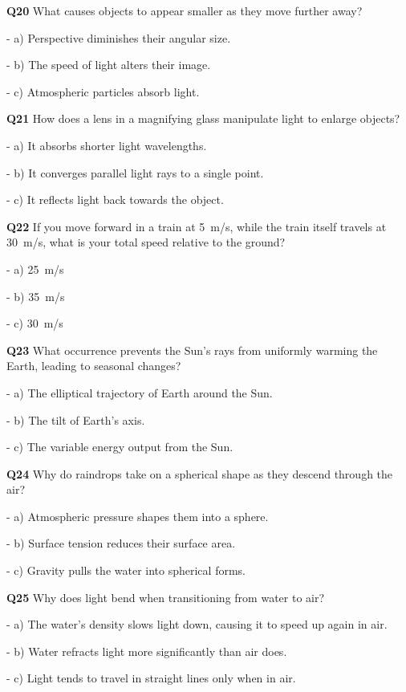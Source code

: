 \textbf{Q20} What causes objects to appear smaller as they move further away?\par
\quad - a) Perspective diminishes their angular size.\par
\quad - b) The speed of light alters their image.\par
\quad - c) Atmospheric particles absorb light.\par

\textbf{Q21} How does a lens in a magnifying glass manipulate light to enlarge objects?\par
\quad - a) It absorbs shorter light wavelengths.\par
\quad - b) It converges parallel light rays to a single point.\par
\quad - c) It reflects light back towards the object.\par

\textbf{Q22} If you move forward in a train at 5 m/s, while the train itself travels at 30 m/s, what is your total speed relative to the ground?\par
\quad - a) 25 m/s\par
\quad - b) 35 m/s\par
\quad - c) 30 m/s\par

\textbf{Q23} What occurrence prevents the Sun's rays from uniformly warming the Earth, leading to seasonal changes?\par
\quad - a) The elliptical trajectory of Earth around the Sun.\par
\quad - b) The tilt of Earth's axis.\par
\quad - c) The variable energy output from the Sun.\par

\textbf{Q24} Why do raindrops take on a spherical shape as they descend through the air?\par
\quad - a) Atmospheric pressure shapes them into a sphere.\par
\quad - b) Surface tension reduces their surface area.\par
\quad - c) Gravity pulls the water into spherical forms.\par

\textbf{Q25} Why does light bend when transitioning from water to air?\par
\quad - a) The water's density slows light down, causing it to speed up again in air.\par
\quad - b) Water refracts light more significantly than air does.\par
\quad - c) Light tends to travel in straight lines only when in air.\par

